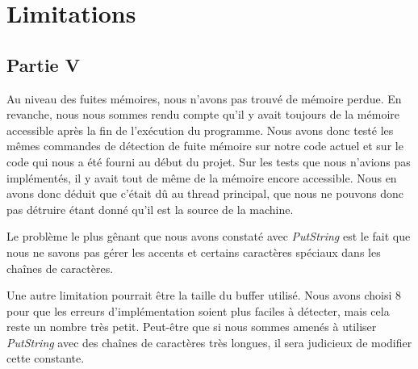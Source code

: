 \documentclass{article}
\begin{document}
\section{Limitations}
\subsection{Partie V}
Au niveau des fuites mémoires, nous n'avons pas trouvé de mémoire perdue. En
revanche, nous nous sommes rendu compte qu'il y avait toujours de la mémoire
accessible après la fin de l'exécution du programme. Nous avons donc testé les
mêmes commandes de détection de fuite mémoire sur notre code actuel et sur le
code qui nous a été fourni au début du projet. Sur les tests que nous n'avions
pas implémentés, il y avait tout de même de la mémoire encore accessible. Nous
en avons donc déduit que c'était dû au thread principal, que nous ne pouvons
donc pas détruire étant donné qu'il est la source de la machine.

Le problème le plus gênant que nous avons constaté avec \textit{PutString} est
le fait que nous ne savons pas gérer les accents et certains caractères
spéciaux dans les chaînes de caractères.

Une autre limitation pourrait être la taille du buffer utilisé. Nous avons
choisi 8 pour que les erreurs d'implémentation soient plus faciles à détecter,
mais cela reste un nombre très petit. Peut-être que si nous sommes amenés à
utiliser \textit{PutString} avec des chaînes de caractères très longues, il
sera judicieux de modifier cette constante.
\end{document}
